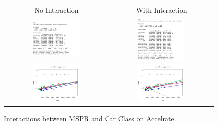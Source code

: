 \documentclass[acmsmall]{acmart}
\begin{document}
\begin{figure}[H] %
	\centering
	\begin{tabular}{p{} p{}}
	\hline
	\multicolumn{1}{|c|}{No Interaction} & \multicolumn{1}{|c|}{With Interaction} \\
		\multicolumn{1}{|c|}{\includegraphics[width=0.48\textwidth]{../graphics/ModAccMsrpNoInt}} &
		\multicolumn{1}{|c|}{\includegraphics[width=0.48\textwidth]{../graphics/ModAccMsrpInt}}\\
		\hline
		\hline
		\multicolumn{1}{|c|}{\includegraphics[width=0.48\textwidth]{../graphics/AccMsrpNoInt}} &
		\multicolumn{1}{|c|}{\includegraphics[width=0.48\textwidth]{../graphics/AccMsrpInt}}\\
		\hline
	\end{tabular}	
	\caption{Interactions between MSPR and Car Class on Accelrate.} %
	\label{fig:INTMSRP}
\end{figure}
\end{document}
